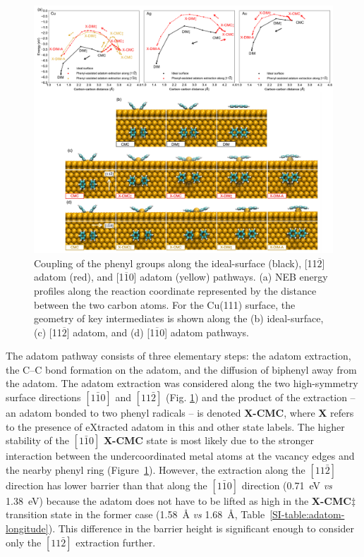\documentclass[aps,prb,amsmath,amssymb,11pt]{revtex4-1}
\begin{document}
\begin{figure}[bt]
\centering
\includegraphics[width=1.0\textwidth]{Fig/distance-energy.pdf}
\caption{Coupling of the phenyl groups along the ideal-surface (black),  [11$\overline{2}$] adatom (red), and  [1$\overline{1}$0] adatom (yellow) pathways. (a) NEB energy profiles along the reaction coordinate represented by the distance between the two carbon atoms. For the Cu(111) surface, the geometry of key intermediates is shown along the (b) ideal-surface, (c) [11$\overline{2}$] adatom, and (d) [1$\overline{1}$0] adatom pathways.}
\label{fig:distance-energy}
\end{figure}

The adatom pathway consists of three elementary steps: the adatom extraction, the C--C bond formation on the adatom, and the diffusion of biphenyl away from the adatom. 
The adatom extraction was considered along the two high-symmetry surface directions $[1\bar{1}0]$ and $[11\bar{2}]$ (Fig. \ref{fig:distance-energy}) and the product of the extraction -- an adatom bonded to two phenyl radicals -- is denoted \textbf{X-CMC}, where \textbf{X} refers to the presence of eXtracted adatom in this and other state labels. 
The higher stability of the $[1\bar{1}0]$ \textbf{X-CMC} state is most likely due to the stronger interaction between the undercoordinated metal atoms at the vacancy edges and the nearby phenyl ring (Figure~\ref{fig:distance-energy}).
However, the extraction along the $[11\bar{2}]$ direction has lower barrier than that along the $[1\bar{1}0]$ direction (\SI{0.71}{\electronvolt} \emph{vs} \SI{1.38}{\electronvolt}) because the adatom does not have to be lifted as high in the \textbf{X-CMC$\ddagger$} transition state in the former case (\SI{1.58}{\angstrom} \emph{vs} \SI{1.68}{\angstrom}, Table~\ref{SI-table:adatom-longitude}). This difference in the barrier height is significant enough to consider only the $[11\bar{2}]$ extraction further.
\end{document}
